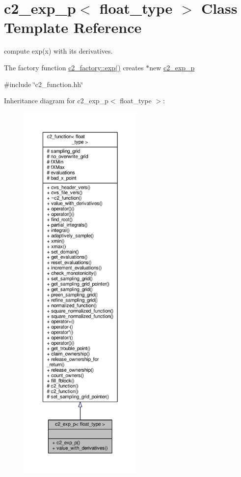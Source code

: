 \hypertarget{classc2__exp__p}{}\section{c2\+\_\+exp\+\_\+p$<$ float\+\_\+type $>$ Class Template Reference}
\label{classc2__exp__p}


compute exp(x) with its derivatives.

The factory function \hyperlink{classc2__factory_ad6c29a455b386c1971e6614f6962f3da}{c2\+\_\+factory\+::exp()} creates $\ast$new \hyperlink{classc2__exp__p}{c2\+\_\+exp\+\_\+p}  




{\ttfamily \#include \char`\"{}c2\+\_\+function.\+hh\char`\"{}}



Inheritance diagram for c2\+\_\+exp\+\_\+p$<$ float\+\_\+type $>$\+:
\nopagebreak
\begin{figure}[H]
\begin{center}
\leavevmode
\includegraphics[height=550pt]{classc2__exp__p__inherit__graph}
\end{center}
\end{figure}


